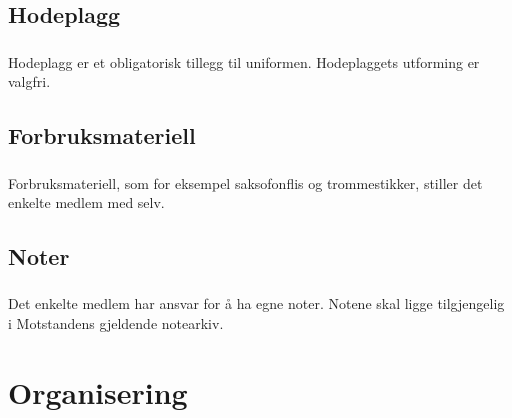 \documentclass{article}
\newenvironment{statute}[1][]
    {
        \titleformat{\subsubsection}[runin]{\normalfont}{\hspace{1pt}\textit{\S\hspace{5pt}\thesubsubsection}}{0pt}{\rule{4pt}{0pt}}{}
        \subsubsection{}#1
        \begin{minipage}[t]{0.89\linewidth}
    }
    {
        \end{minipage}
        
        \ignorespacesafterend
    }
\begin{document}
        \subsection{Hodeplagg}
            \begin{statute}
                Hodeplagg er et obligatorisk tillegg til uniformen. Hodeplaggets utforming er valgfri.
            \end{statute}
            
        \subsection{Forbruksmateriell}
            \begin{statute}
                Forbruksmateriell, som for eksempel saksofonflis og trommestikker, stiller det enkelte medlem med selv.
            \end{statute}
            
        \subsection{Noter}
            \begin{statute}
                Det enkelte medlem har ansvar for å ha egne noter. Notene skal ligge tilgjengelig i Motstandens gjeldende notearkiv.
            \end{statute}
            
    \section{Organisering}
\end{document}

